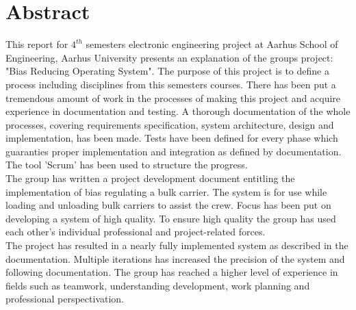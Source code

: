 \chapter{Abstract}
This report for $4^{th}$ semesters electronic engineering project at Aarhus School of Engineering, Aarhus University presents an explanation of the groups project: "Bias Reducing Operating System". The purpose of this project is to define a process including disciplines from this semesters courses. There has been put a tremendous amount of work in the processes of making this project and acquire experience in documentation and testing.  A thorough documentation of the whole processes, covering requirements specification, system architecture, design and implementation, has been made. Tests have been defined for every phase which guaranties proper implementation and integration as defined by documentation. The tool 'Scrum' has been used to structure the progress.\\
The group has written a project development document entitling the implementation of bias regulating a bulk carrier. The system is for use while loading and unloading bulk carriers to assist the crew. Focus has been put on developing a system of high quality. To ensure high quality the group has used each other's individual professional and project-related forces.\\
The project has resulted in a nearly fully implemented system as described in the documentation. Multiple iterations has increased the precision of the system and following documentation. The group has reached a higher level of experience in fields such as teamwork, understanding development, work planning and professional perspectivation.

\newpage